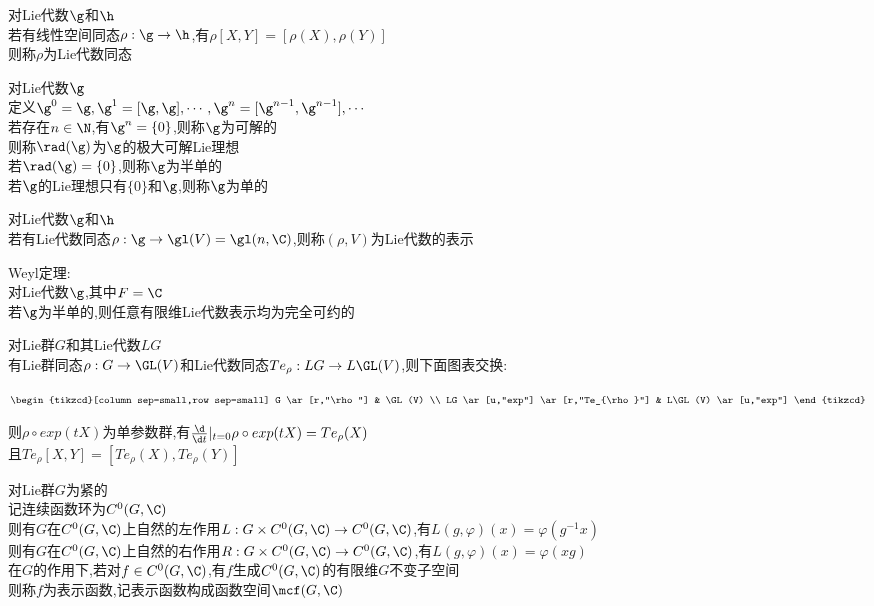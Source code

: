 \begin{dingyi}
对Lie代数$\g$和$\h$\\
若有线性空间同态$\rho:\g\to\h$,有$\rho[X,Y]=[\rho(X),\rho(Y)]$\\
则称$\rho$为Lie代数同态
\end{dingyi}

\begin{dingyi}
对Lie代数$\g$\\
定义$\g^{0}=\g,\g^{1}=[\g,\g],\cdots,\g^{n}=[\g^{n-1},\g^{n-1}],\cdots$\\
若存在$n\in \N$,有$\g^n=\{0\}$,则称$\g$为可解的\\
则称$\rad(\g)$为$\g$的极大可解Lie理想\\
若$\rad(\g)=\{0\}$,则称$\g$为半单的\\
若$\g$的Lie理想只有$\{0\}$和$\g$,则称$\g$为单的
\end{dingyi}

\begin{dingyi}
对Lie代数$\g$和$\h$\\
若有Lie代数同态$\rho:\g\to\gl(V)=\gl(n,\C)$,则称$(\rho,V)$为Lie代数的表示
\end{dingyi}

\begin{dingli}
Weyl定理:\\
对Lie代数$\g$,其中$F=\C$\\
若$\g$为半单的,则任意有限维Lie代数表示均为完全可约的
\end{dingli}

\begin{dingli}
对Lie群$G$和其Lie代数$LG$\\
有Lie群同态$\rho:G\to \GL(V)$和Lie代数同态$Te_{\rho}:LG\to L\GL(V)$,则下面图表交换:
\begin{center}
    $\begin{tikzcd}[column sep=small,row sep=small]
    G \ar[r,"\rho"] & \GL(V) \\
    LG \ar[u,"exp"] \ar[r,"Te_{\rho}"] & L\GL(V) \ar[u,"exp"]    
    \end{tikzcd}$
\end{center}
则$\rho\circ exp(tX)$为单参数群,有$\frac{\d}{\d t}|_{t=0}\rho\circ exp(tX)=Te_{\rho}(X)$\\
且$Te_{\rho}[X,Y]=[Te_{\rho}(X),Te_{\rho}(Y)]$
\end{dingli}

\begin{dingyi}
对Lie群$G$为紧的\\
记连续函数环为$C^{0}(G,\C)$\\
则有$G$在$C^{0}(G,\C)$上自然的左作用$L:G\times C^{0}(G,\C)\to C^{0}(G,\C)$,有$L(g,\varphi)(x)=\varphi(g^{-1}x)$\\
则有$G$在$C^{0}(G,\C)$上自然的右作用$R:G\times C^{0}(G,\C)\to C^{0}(G,\C)$,有$L(g,\varphi)(x)=\varphi(xg)$\\
在$G$的作用下,若对$f\in C^{0}(G,\C)$,有$f$生成$C^{0}(G,\C)$的有限维$G$不变子空间\\
则称$f$为表示函数,记表示函数构成函数空间$\mcf(G,\C)$
\end{dingyi}

